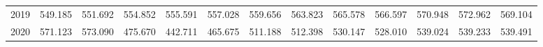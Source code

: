 \begin{tabular}{lllllllllllll}
\multicolumn{1}{l}{\hspace{1em}2019} &
  \multicolumn{1}{|r}{549.185} &
  \multicolumn{1}{r}{551.692} &
  \multicolumn{1}{r}{554.852} &
  \multicolumn{1}{r}{555.591} &
  \multicolumn{1}{r}{557.028} &
  \multicolumn{1}{r}{559.656} &
  \multicolumn{1}{r}{563.823} &
  \multicolumn{1}{r}{565.578} &
  \multicolumn{1}{r}{566.597} &
  \multicolumn{1}{r}{570.948} &
  \multicolumn{1}{r}{572.962} &
  \multicolumn{1}{r}{569.104} \\
\multicolumn{1}{l}{\hspace{1em}2020} &
  \multicolumn{1}{|r}{571.123} &
  \multicolumn{1}{r}{573.090} &
  \multicolumn{1}{r}{475.670} &
  \multicolumn{1}{r}{442.711} &
  \multicolumn{1}{r}{465.675} &
  \multicolumn{1}{r}{511.188} &
  \multicolumn{1}{r}{512.398} &
  \multicolumn{1}{r}{530.147} &
  \multicolumn{1}{r}{528.010} &
  \multicolumn{1}{r}{539.024} &
  \multicolumn{1}{r}{539.233} &
  \multicolumn{1}{r}{539.491} \\
\cline{1-13}
\end{tabular}
